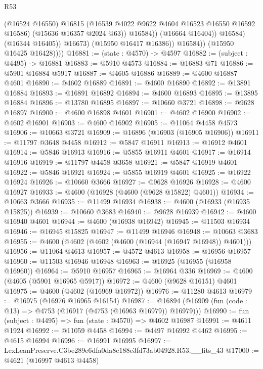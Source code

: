 \begin{lexlean}{R53}
\begin{coremodule}
                              (@16524 @16550)
                              @16815
                              (@16539 @4022 @9622 @4604 @16523 @16550 @16592 @16586)
                              (@15636 @16357 @2024 @63))
                            @16584))
                        (@16664 @16404))
                      @16584)
                    (@16344 @16405))
                  @16673)
                (@15950 @16417 @16386))
              @16584))
          (@15950 @16425 @16428))))
@16881 := (state : @4570) -> @4597
@16882 := (subject : @4495) -> @16881
@16883 := @5910 @4573
@16884 := @16883 @71
@16886 := @5901 @16884 @5917
@16887 := @4605 @16886
@16889 := @4600 @16887 @4601
@16890 := @4602 @16889
@16891 := @4600 @16890
@16892 := @13891 @16884
@16893 := @16891 @16892
@16894 := @4600 @16893
@16895 := @13895 @16884
@16896 := @13780 @16895
@16897 := @10660 @3721
@16898 := @9628 @16897
@16900 := @4600 @16898 @4601
@16901 := @4602 @16900
@16902 := @4602 @16901
@16903 := @4600 @16902
@16905 := @11064 @4458 @4573
@16906 := @10663 @3721
@16909 := @16896 (@16903 (@16905 @16906))
@16911 := @11797 @3648 @4458
@16912 := @5847 @16911
@16913 := @16912 @4601
@16914 := @5846 @16913
@16916 := @5855 @16911 @4601
@16917 := @16914 @16916
@16919 := @11797 @4458 @3658
@16921 := @5847 @16919 @4601
@16922 := @5846 @16921
@16924 := @5855 @16919 @4601
@16925 := @16922 @16924
@16926 := @10660 @3666
@16927 := @9628 @16926
@16928 := @4600 @16927
@16933 := @4600 (@16928 (@4600 (@9628 @15822) @4601))
@16934 := @10663 @3666
@16935 := @11499 @16934
@16938 := @4600 (@16933 (@16935 @15825))
@16939 := @10660 @3683
@16940 := @9628 @16939
@16942 := @4600 @16940 @4601
@16944 := @4600 (@16938 @16942)
@16945 := @11503 @16934
@16946 := @16945 @15825
@16947 := @11499 @16946
@16948 := @10663 @3683
@16955 := @4600 (@4602 (@4602 (@4600 (@16944 (@16947 @16948)) @4601)))
@16956 := @11064 @4613
@16957 := @4572 @4613
@16958 := @16956 @16957
@16960 := @11503 @16946 @16948
@16963 := @16925 (@16955 (@16958 @16960))
@16964 := @5910 @16957
@16965 := @16964 @336
@16969 := @4600 (@4605 (@5901 @16965 @5917))
@16972 := @4600 (@9628 @16151) @4601
@16975 := @4600 (@4602 (@16969 @16972))
@16976 := @11280 @4613
@16979 := @16975 (@16976 @16965 @16154)
@16987 := @16894 (@16909 (fun (code : @13) => @4753 (@16917 (@4753 (@16963 @16979)) @16979)))
@16990 := fun (subject : @4495) => fun (state : @4570) => @4602 @16987
@16991 := @4611 @1924
@16992 := @11059 @4458
@16994 := @4497 @16992 @4462
@16995 := @4615 @16994
@16996 := @16991 @16995
@16997 := LexLeanPreserve.C3be289e6dfa0da8c188e3fd73ab04928.R53.__fits_43
@17000 := @4621 (@16997 @4613 @4458)

\end{coremodule}
\end{lexlean}
